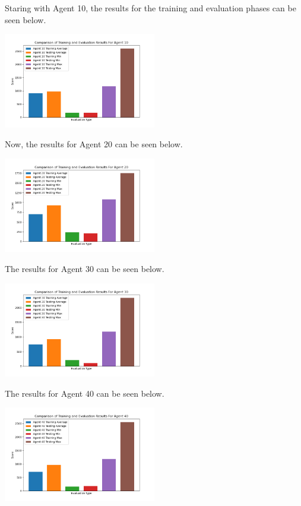 \documentclass[
	a4paper, %
	10pt, %
	unnumberedsections, %
	twoside, %
]{LTJournalArticle}
\begin{document}
Staring with Agent 10, the results for the training and evaluation phases can be seen below.

\begin{center}
	\includegraphics[width=0.5\textwidth]{Figures/Comparison/Agent 10.png}
\end{center}

Now, the results for Agent 20 can be seen below.

\begin{center}
	\includegraphics[width=0.5\textwidth]{Figures/Comparison/Agent 20.png}
\end{center}

The results for Agent 30 can be seen below.

\begin{center}
	\includegraphics[width=0.5\textwidth]{Figures/Comparison/Agent 30.png}
\end{center}

The results for Agent 40 can be seen below.

\begin{center}
	\includegraphics[width=0.5\textwidth]{Figures/Comparison/Agent 40.png}
\end{center}
\end{document}
